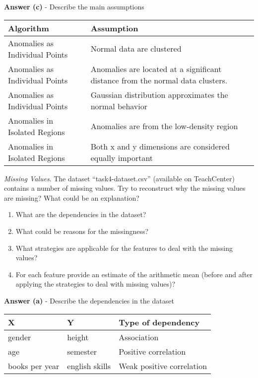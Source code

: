 \documentclass[a4paper,10pt]{article}\setlength{\textheight}{10in}\setlength{\textwidth}{6.5in}\setlength{\topmargin}{-0.125in}\setlength{\oddsidemargin}{-.2in}\setlength{\evensidemargin}{-.2in}\setlength{\headsep}{0.2in}\setlength{\footskip}{0pt}\usepackage{amsmath}\usepackage{fancyhdr}\usepackage{enumitem}\usepackage{hyperref}\usepackage{xcolor}\usepackage{graphicx}\usepackage[export]{adjustbox}\usepackage{caption}\usepackage{float}\usepackage{booktabs}\usepackage{makecell}\pagestyle{fancy}
\begin{document}
\begin{enumerate}[topsep=0mm, partopsep=0mm, leftmargin=*]
\textbf{Answer (c)} - Describe the main assumptions \\
\begin{center}
\begin{tabular}{ll}
\toprule
\textbf{Algorithm} & \textbf{Assumption} \\ \midrule
Anomalies as Individual Points & Normal data are clustered \\
Anomalies as Individual Points & Anomalies are located at a significant distance from the normal data clusters. \\ 
Anomalies as Individual Points & Gaussian distribution approximates the normal behavior \\
Anomalies in Isolated Regions & Anomalies are from the low-density region \\
Anomalies in Isolated Regions & Both x and y dimensions are considered equally important \\ 
\bottomrule
\end{tabular}
\end{center}





{\color{blue}
\clearpage\item\textit{Missing Values}. The dataset ``task4-dataset.csv'' (available on TeachCenter) contains a number of missing values. Try to reconstruct why the missing values are missing? What could be an explanation?
\begin{enumerate}
	\item What are the dependencies in the dataset?
	\item What could be reasons for the missingness?
	\item What strategies are applicable for the features to deal with the missing values?
	\item For each feature provide an estimate of the arithmetic mean (before and after applying the strategies to deal with missing values)?
\end{enumerate}
}

\textbf{Answer (a)} - Describe the dependencies in the dataset
\begin{center}
\begin{tabular}{lll}
\toprule
\textbf{X} & \textbf{Y} & \textbf{Type of dependency} \\ \midrule
gender & height & Association \\
age & semester & Positive correlation \\
books per year & english skills & Weak positive correlation \\
\bottomrule
\end{tabular}
\end{center}


\end{enumerate}
\end{document}
